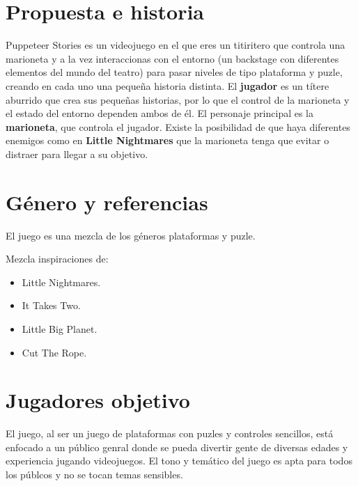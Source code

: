 \documentclass[12pt,twoside,letterpaper]{article}
\begin{document}



\newpage


\section{Propuesta e historia}

Puppeteer Stories es un videojuego en el que eres un titiritero que controla una marioneta y a la vez interaccionas con el entorno (un backstage con diferentes elementos del mundo del teatro) para pasar niveles de tipo plataforma y puzle, creando en cada uno una pequeña historia distinta.
El \textbf{jugador} es un títere aburrido que crea sus pequeñas historias, por lo que el control de la marioneta y el estado del entorno dependen ambos de él.
El personaje principal es la \textbf{marioneta}, que controla el jugador.
Existe la posibilidad de que haya diferentes enemigos como en \textbf{Little Nightmares} que la marioneta tenga que evitar o distraer para llegar a su objetivo.

\section{Género y referencias}

El juego es una mezcla de los géneros plataformas y puzle.

Mezcla inspiraciones de:
\begin{itemize}
    \item Little Nightmares.
    \item It Takes Two.
    \item Little Big Planet.
    \item Cut The Rope.
\end{itemize}

\section{Jugadores objetivo}

El juego, al ser un juego de plataformas con puzles y controles sencillos, está enfocado a un público genral donde se pueda divertir gente de diversas edades y experiencia jugando videojuegos. El tono y temático del juego es apta para todos los públcos y no se tocan temas sensibles.
\end{document}
